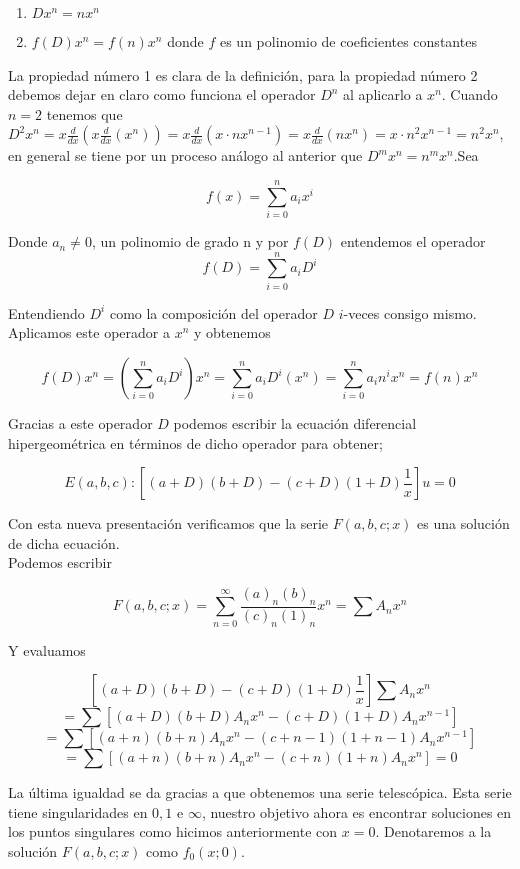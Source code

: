 \documentclass[12pt]{article}
\theoremstyle{definition}
\theoremstyle{remark}
\numberwithin{equation}{section}
\begin{document}
\begin{enumerate}
\item $Dx^{n}= nx^{n}$
\item $f(D)x^{n}=f(n)x^{n}$ donde $f$ es un polinomio de coeficientes constantes
\end{enumerate}

La propiedad n\'umero 1 es clara de la definici\'on, para la propiedad n\'umero 2 debemos dejar en claro como funciona el operador $D^{n}$ al aplicarlo a $x^{n}$. Cuando $n=2$ tenemos que $D^{2} x^{n} = x\frac{d}{dx} (x\frac{d}{dx} (x^{n}) )= x\frac{d}{dx}(x \cdot nx^{n-1})=x\frac{d}{dx} (nx^{n} ) = x\cdot n^{2}x^{n-1}=n^{2}x^{n}$, en general se tiene por un proceso an\'alogo al anterior que $D^{m}x^{n}=n^{m}x^{n}$.Sea

$$ f(x)= \sum_{i=0}^{n} a_{i}x^{i} $$

Donde $a_{n} \neq 0$, un polinomio de grado n y por $f(D)$ entendemos el operador $$f(D) = \sum_{i=0}^{n} a_{i}D^{i}$$

Entendiendo $D^{i}$ como la composici\'on del operador $D$ $i$-veces consigo mismo. Aplicamos este operador a $x^{n}$ y obtenemos

$$f(D)x^{n}=(\sum_{i=0}^{n}a_{i}D^{i}) x^{n} = \sum_{i=0}^{n}a_{i} D^{i}( x^{n}) = \sum_{i=0}^{n}a_{i}n^{i}x^{n} = f(n)x^{n}   $$


Gracias a este operador $D$ podemos escribir la ecuaci\'on diferencial hipergeom\'etrica en t\'erminos de dicho operador para obtener;

$$E(a,b,c): [(a+D)(b+D)- (c+D)(1+D)\frac{1}{x}]u=0$$

Con esta nueva presentaci\'on verificamos que la serie $F(a,b,c;x)$ es una soluci\'on de dicha ecuaci\'on. \\

Podemos escribir 

$$F(a,b,c;x)= \sum_{n=0}^{\infty } \frac{(a)_{n} (b)_{n}}{(c)_{n}(1)_{n}} x^{n} = \sum A_{n} x^{n}$$

Y evaluamos

$$[(a+D)(b+D)- (c+D)(1+D)\frac{1}{x}] \sum A_{n}x^{n}$$
$$= \sum [(a+D)(b+D)A_{n}x^{n}- (c+D)(1+D)A_{n}x^{n-1}]$$
$$= \sum [(a+n)(b+n)A_{n}x^{n}- (c+n-1)(1+n-1)A_{n}x^{n-1}]$$
$$= \sum [(a+n)(b+n)A_{n}x^{n}- (c+n)(1+n)A_{n}x^{n}]=0$$


La \'ultima igualdad se da gracias a que obtenemos una serie telesc\'opica. Esta serie tiene singularidades en $0,1$ e $\infty$, nuestro objetivo ahora es encontrar soluciones en los puntos singulares como hicimos anteriormente con $x=0$. Denotaremos  a la soluci\'on  $F(a,b,c;x)$ como $f_{0}(x;0)$. \\
\end{document}
